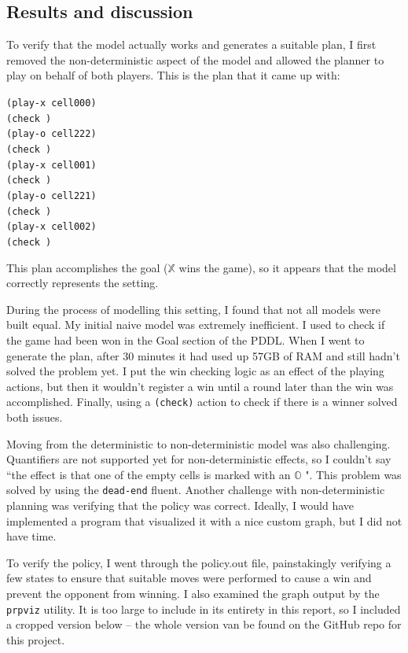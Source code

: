 \documentclass[11pt]{article}
\newcommand{\XX}{$\mathbb{X}$ }
\newcommand{\OO}{$\mathbb{O}$ }
\begin{document}
\subsection{Results and discussion}
To verify that the model actually works and generates a suitable plan, I first removed the non-deterministic aspect of the model and allowed the planner to play on behalf of both players. This is the plan that it came up with:
\begin{displayquote}
\texttt{(play-x cell000)\\
(check )\\
(play-o cell222)\\
(check )\\
(play-x cell001)\\
(check )\\
(play-o cell221)\\
(check )\\
(play-x cell002)\\
(check )}
\end{displayquote}

This plan accomplishes the goal (\XX wins the game), so it appears that the model correctly represents the setting.

During the process of modelling this setting, I found that not all models were built equal. My initial naive model was extremely inefficient. I used to check if the game had been won in the Goal section of the PDDL. When I went to generate the plan, after 30 minutes it had used up 57GB of RAM and still hadn't solved the problem yet. I put the win checking logic as an effect of the playing actions, but then it wouldn't register a win until a round later than the win was accomplished. Finally, using a \texttt{(check)} action to check if there is a winner solved both issues.

Moving from the deterministic to non-deterministic model was also challenging. Quantifiers are not supported yet for non-deterministic effects, so I couldn't say ``the effect is that one of the empty cells is marked with an \OO". This problem was solved by using the \texttt{dead-end} fluent. Another challenge with non-deterministic planning was verifying that the policy was correct. Ideally, I would have implemented a program that visualized it with a nice custom graph, but I did not have time.

To verify the policy, I went through the policy.out file, painstakingly verifying a few states to ensure that suitable moves were performed to cause a win and prevent the opponent from winning. I also examined the graph output by the \texttt{prpviz} utility. It is too large to include in its entirety in this report, so I included a cropped version below -- the whole version van be found on the GitHub repo for this project.
\end{document}
